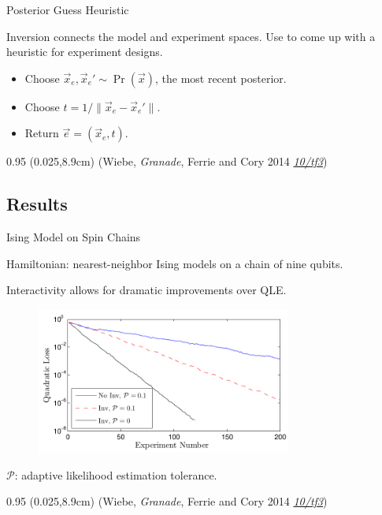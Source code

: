 \documentclass[xcolor=dvipsnames, compress]{beamer}
\renewcommand\UrlFont{\color{red}\rmfamily\itshape}
\newcommand{\shortdoi}[1]{\href{http://doi.org/#1}{\UrlFont 10/#1}}
\newcommand{\bottomnote}[1]{
  \begin{textblock*}{0.95\paperwidth} (0.025\paperwidth,8.9cm)
    {\tiny \hfill #1}
  \end{textblock*}
}
\begin{document}
\begin{frame}{Posterior Guess Heuristic}
 
    Inversion connects the model and experiment spaces.
    Use to come up with a heuristic for experiment designs.
    
    \begin{itemize}
     \item Choose $\vec{x}_e, \vec{x}_e' \sim \Pr(\vec{x})$, the most recent posterior.
     \item Choose $t = 1 / \|\vec{x}_e - \vec{x}_e'\|$.
     \item Return $\vec{e} = (\vec{x}_e, t)$.
    \end{itemize}

  \bottomnote{(Wiebe, \emph{Granade}, Ferrie and Cory 2014 \shortdoi{tf3})}

 
\end{frame}

\subsection{Results}

\begin{frame}{Ising Model on Spin Chains}

    Hamiltonian: nearest-neighbor Ising models on a chain
    of nine qubits.

    Interactivity allows for dramatic improvements over
    QLE.
    
    \begin{figure}
      \includegraphics[width=0.75\textwidth]{poison}
    \end{figure}

    $\mathcal{P}$: adaptive likelihood estimation tolerance.

  \bottomnote{(Wiebe, \emph{Granade}, Ferrie and Cory 2014 \shortdoi{tf3})}

\end{frame}
\end{document}
